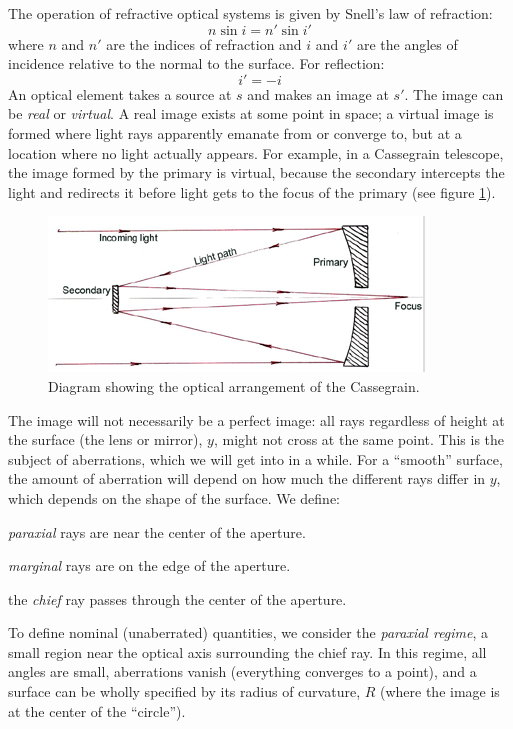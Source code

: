 \documentclass[12pt]{article}
\begin{document}
The operation of refractive optical systems is given by Snell's law
of refraction:
    $$ n\sin{i} = n'\sin{i'} $$
where $n$ and $n'$ are the indices of refraction and $i$ and $i'$ are the
angles of incidence relative to the normal to the surface. For
reflection:
    $$ i' = -i $$
An optical element takes a source at $s$ and makes an image at $s'$.
The image can be \emph{real} or \emph{virtual}.
A real image exists at some point in
space; a virtual image is formed where light rays apparently emanate
from or converge to, but at a location where no light actually
appears. For example, in a Cassegrain telescope, the image formed by
the primary is virtual, because the secondary intercepts the light and
redirects it before light gets to the focus of the primary
(see figure \ref{cassegrain}).
\begin{figure}[h]
    \centering
    \includegraphics{cassegrain.png}
    \caption{Diagram showing the optical arrangement of the Cassegrain.}
    \label{cassegrain}
\end{figure}

The image will not necessarily be a perfect image: all rays regardless
of height at the surface (the lens or mirror),
$y$, might not cross at the same point. This
is the subject of aberrations, which we will get into in a while. For
a ``smooth'' surface, the amount of aberration will depend on how much
the different rays differ in $y$, which depends on the shape of the
surface. We define:
\begin{itemize*}
    \item \emph{paraxial} rays are near the center of the aperture.
    \item \emph{marginal} rays are on the edge of the aperture.
    \item the \emph{chief} ray passes through the center of the aperture.
\end{itemize*}
To define nominal (unaberrated) quantities, we consider the
\emph{paraxial regime}, a small region near the optical axis surrounding the
chief ray. In this regime, all angles are small, aberrations vanish
(everything converges to a point),
and a surface can be wholly specified by its radius of curvature, $R$
(where the image is at the center of the ``circle'').
\end{document}
